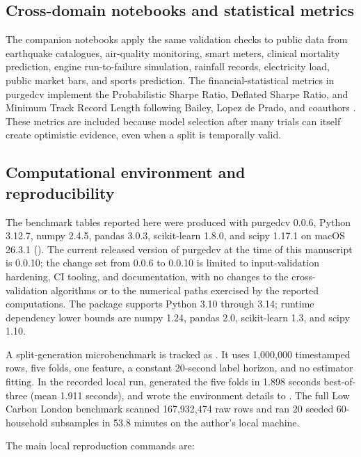\documentclass[10pt]{article}
\newcommand{\pcv}{\textsf{purgedcv}}
\newcommand{\pkg}[1]{\textsf{#1}}
\DeclareRobustCommand{\code}[1]{\texttt{\detokenize{#1}}}
\begin{document}
\subsection{Cross-domain notebooks and statistical metrics}

The companion notebooks apply the same validation checks to public data from
earthquake catalogues, air-quality monitoring, smart meters, clinical mortality
prediction, engine run-to-failure simulation, rainfall records, electricity
load, public market bars, and sports prediction. The financial-statistical
metrics in \pcv{} implement the Probabilistic Sharpe Ratio, Deflated Sharpe
Ratio, and Minimum Track Record Length following Bailey, Lopez de Prado, and
coauthors \citep{bailey2012psr,bailey2014dsr}. These metrics are included
because model selection after many trials can itself create optimistic evidence,
even when a split is temporally valid.

\subsection{Computational environment and reproducibility}

The benchmark tables reported here were produced with \pcv{} 0.0.6, Python
3.12.7, \pkg{numpy} 2.4.5, \pkg{pandas} 3.0.3, \pkg{scikit-learn} 1.8.0, and
\pkg{scipy} 1.17.1 on macOS 26.3.1 (\code{arm64}). The current released
version of \pcv{} at the time of this manuscript is 0.0.10; the change set from
0.0.6 to 0.0.10 is limited to input-validation hardening, CI tooling, and
documentation, with no changes to the cross-validation algorithms or to the
numerical paths exercised by the reported computations. The package supports
Python 3.10 through 3.14; runtime dependency lower bounds are \pkg{numpy} 1.24,
\pkg{pandas} 2.0, \pkg{scikit-learn} 1.3, and \pkg{scipy} 1.10.

A split-generation microbenchmark is tracked as \code{tools/microbench.py}. It
uses 1,000,000 timestamped rows, five folds, one feature, a constant 20-second
label horizon, and no estimator fitting. In the recorded local run,
\code{PurgedKFold} generated the five folds in 1.898 seconds best-of-three
(mean 1.911 seconds), and wrote the environment details to
. The full Low Carbon London benchmark
scanned 167,932,474 raw rows and ran 20 seeded 60-household subsamples in 53.8
minutes on the author's local machine.

The main local reproduction commands are:
\end{document}
